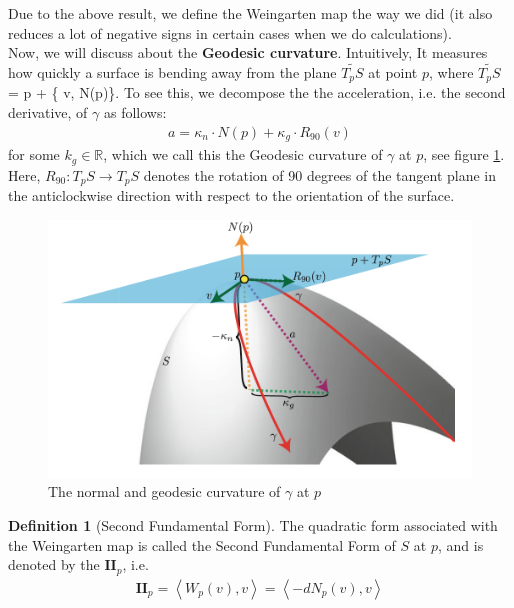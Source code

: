 \documentclass{article}
\theoremstyle{plain}
\theoremstyle{definition}
\newtheorem{definition}{Definition}
\theoremstyle{remark}
\newcommand{\R}{\mathbb{R}}
\begin{document}
Due to the above result, we define the Weingarten map the way we did (it also reduces a lot of negative signs in certain cases when we do calculations). \\
Now, we will discuss about the \textbf{Geodesic curvature}. Intuitively, It measures how quickly a surface is bending away from the plane \( \widetilde{T_pS}\) at point \(p\), where \( \widetilde{T_pS}\) = p + \{ v, N(p)\}. To see this, we decompose the the acceleration, i.e. the second derivative, of \( \gamma\) as follows:
\begin{align*}
    a = \kappa_n \cdot N(p) + \kappa_g \cdot R_{90}(v)
\end{align*}
for some \(k_g \in \R\), which we call this the Geodesic curvature of \( \gamma\) at \(p\), see figure \ref{fig:normal_and_geodesic_curvature}. Here, \( R_{90}: T_pS \rightarrow T_pS \) denotes the rotation of 90 degrees of the tangent plane in the anticlockwise direction with respect to the orientation of the surface. \\
\begin{figure}[h]
    \centering
    \includegraphics[width=12cm]{./images/normal_and_geodesic_curvature}
    \caption{The normal and geodesic curvature of \(\gamma\) at \(p\)}
    \label{fig:normal_and_geodesic_curvature}
\end{figure}

\begin{definition}[Second Fundamental Form]
    The quadratic form associated with the Weingarten map is called the Second Fundamental Form of \(S\) at \(p\),   and is denoted by the \(\mathbf{II}_p\), i.e.
    \begin{align*}
        \mathbf{II}_p = \left\langle W_p(v), v\right\rangle = \left\langle -dN_p(v), v \right\rangle
    \end{align*}
\end{definition}
\end{document}
